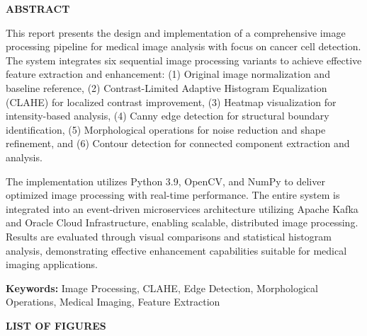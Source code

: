 \documentclass[12pt,a4paper]{article}
\begin{document}
\newpage
\begin{center}
    {\Large\textbf{ABSTRACT}}
\end{center}

This report presents the design and implementation of a comprehensive image processing pipeline for medical image analysis with focus on cancer cell detection. The system integrates six sequential image processing variants to achieve effective feature extraction and enhancement: (1) Original image normalization and baseline reference, (2) Contrast-Limited Adaptive Histogram Equalization (CLAHE) for localized contrast improvement, (3) Heatmap visualization for intensity-based analysis, (4) Canny edge detection for structural boundary identification, (5) Morphological operations for noise reduction and shape refinement, and (6) Contour detection for connected component extraction and analysis.

The implementation utilizes Python 3.9, OpenCV, and NumPy to deliver optimized image processing with real-time performance. The entire system is integrated into an event-driven microservices architecture utilizing Apache Kafka and Oracle Cloud Infrastructure, enabling scalable, distributed image processing. Results are evaluated through visual comparisons and statistical histogram analysis, demonstrating effective enhancement capabilities suitable for medical imaging applications.

\vspace{0.5cm}
\noindent\textbf{Keywords:} Image Processing, CLAHE, Edge Detection, Morphological Operations, Medical Imaging, Feature Extraction

\newpage

\tableofcontents
\newpage

\newpage
\begin{center}
    {\Large\textbf{LIST OF FIGURES}}
\end{center}
\end{document}
